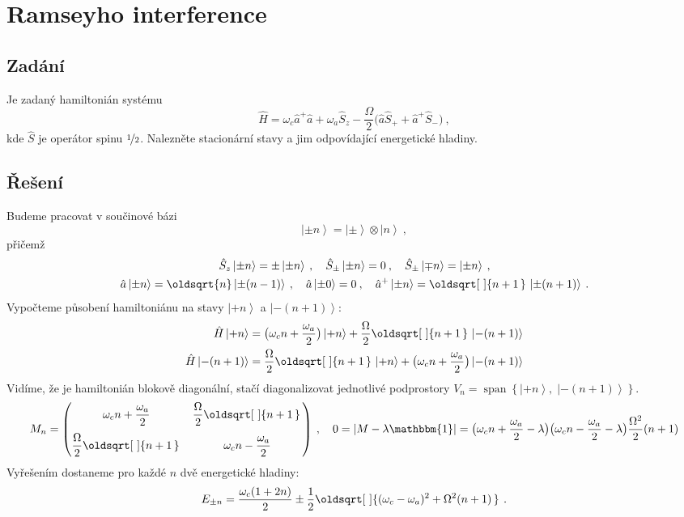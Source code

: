 \documentclass[10pt,a4paper]{article}
\renewcommand*{\sqrt}[2][\ ]{\oldsqrt[#1]{#2\,}\,}
\newcommand{\mat}[1]{
    \begin{pmatrix}
        #1
    \end{pmatrix}
}
\newcommand{\ket}[1]{\left| #1 \right>}
\def\Span{\operatorname{span}}
\def\1{\mathbbm{1}}
\begin{document}
\section{Ramseyho interference}
\subsection{Zadání}
Je zadaný hamiltonián systému
\begin{equation*}
    \hat H
    = \omega_c \hat a^+ \hat a
    + \omega_a \hat S_z
    - \frac{\Omega}{2}
    \big( \hat a \hat S_+ + \hat a^+ \hat S_- \big)
    \: ,
\end{equation*}
kde $\hat S$ je operátor spinu $\nicefrac{1}{2}$.  Nalezněte stacionární stavy a jim odpovídající energetické hladiny.

\subsection{Řešení}
Budeme pracovat v součinové bázi
\begin{equation*}
    \ket{\pm n} = \ket{\pm} \otimes \ket{n} \: ,
\end{equation*}
přičemž
\begin{gather*}
    \hat S_z \ket{\pm n} = \pm \ket{\pm n} \: , \quad
    \hat S_\pm \ket{\pm n} = 0 \: , \quad
    \hat S_\pm \ket{\mp n} = \ket{\pm n} \: , \\
    \hat a \ket{\pm n} = \oldsqrt{n} \ket{\pm (n-1)} \: , \quad
    \hat a \ket{\pm 0} = 0 \: , \quad
    \hat a^+ \ket{\pm n} = \sqrt{n+1} \ket{\pm (n+1)} \: .
\end{gather*}
Vypočteme působení hamiltoniánu na stavy $\ket{+n}$ a $\ket{-(n+1)}$:
\begin{align*}
    \hat H \ket{+n} &= \big( \omega_c n + \frac{\omega_a}{2} \big) \ket{+n} + \frac{\Omega}{2} \sqrt{n+1} \ket{-(n+1)}
    \\
    \hat H \ket{-(n+1)} &= \frac{\Omega}{2} \sqrt{n+1} \ket{+n} + \big( \omega_c n + \frac{\omega_a}{2} \big) \ket{-(n+1)}
\end{align*}
Vidíme, že je hamiltonián blokově diagonální, stačí diagonalizovat jednotlivé podprostory $V_n = \Span \left\{ \ket{+n}, \; \ket{-(n+1)} \right\}$.
\begin{align*}
    M_n = \mat{
        \omega_c n + \dfrac{\omega_a}{2}
        & \dfrac{\Omega}{2} \sqrt{n+1}
        \\[10pt]
        \dfrac{\Omega}{2} \sqrt{n+1} &
        \omega_c n - \dfrac{\omega_a}{2}
    }
    \: , \quad
    0 = |M - \lambda \1| =
    \big( \omega_c n + \frac{\omega_a}{2} - \lambda \big)
    \big( \omega_c n - \frac{\omega_a}{2} - \lambda \big)
    \frac{\Omega^2}{2} (n+1)
\end{align*}
Vyřešením dostaneme pro každé $n$ dvě energetické hladiny:
\begin{equation*}
    E_{\pm n} =
    \frac{\omega_c (1+2n)}{2}
    \pm
    \frac{1}{2}
    \sqrt{
        (\omega_c - \omega_a)^2 +
        \Omega^2 (n+1)
    }
    \: .
\end{equation*}
\end{document}
